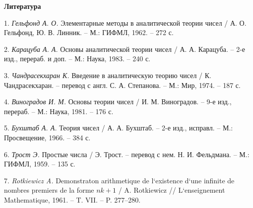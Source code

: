 \centerline{\bf Литература}

1. {\it Гельфонд А. О.} Элементарные методы в аналитической теории чисел / А. О. Гельфонд, Ю. В. Линник. -- М.: ГИФМЛ, 1962. -- 272 с.

2. {\it Карацуба А. А.} Основы аналитической теории чисел / А. А. Карацуба. -- 2-е изд., перераб. и доп. -- М.: Наука, 1983. -- 240 с.

3. {\it Чандрасекхаран К.} Введение в аналитическую теорию чисел / К. Чандрасекхаран. -- перевод с англ. С. А. Степанова. -- М.: Мир, 1974. -- 187 с.

4. {\it Виноградов И. М.} Основы теории чисел / И. М. Виноградов. -- 9-е изд., перераб. -- М.: Наука, 1981. -- 176 с.

5. {\it Бухштаб А. А.} Теория чисел / А. А. Бухштаб. -- 2-е изд., исправл. -- М.: Просвещение, 1966. -- 384 с.

6. {\it Трост Э.} Простые числа / Э. Трост. -- перевод с нем. Н. И. Фельдмана. -- М.: ГИФМЛ, 1959. -- 135 с.

7. {\it Rotkiewicz A.} Demonstraton arithmetique de l`existence d`une infinite de nombres premiers de la forme $nk+ 1$ / A. Rotkiewicz // L`enseignement Mathematique, 1961. -- T. VII. -- P. 277--280.




